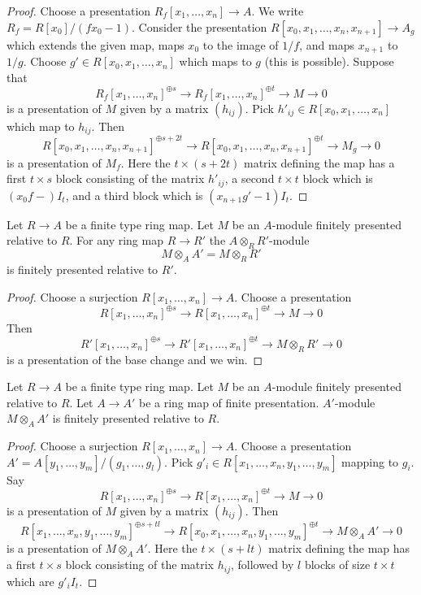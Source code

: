 \begin{proof}
Choose a presentation $R_f[x_1, \ldots, x_n] \to A$. We write
$R_f = R[x_0]/(fx_0 - 1)$. Consider the presentation
$R[x_0, x_1, \ldots, x_n, x_{n + 1}] \to A_g$ which extends the given
map, maps $x_0$ to the image of $1/f$, and maps $x_{n + 1}$ to $1/g$.
Choose $g' \in R[x_0, x_1, \ldots, x_n]$ which maps to $g$ (this is
possible). Suppose that
$$
R_f[x_1, \ldots, x_n]^{\oplus s} \to
R_f[x_1, \ldots, x_n]^{\oplus t} \to M \to 0
$$
is a presentation of $M$ given by a matrix $(h_{ij})$. Pick
$h'_{ij} \in R[x_0, x_1, \ldots, x_n]$ which map to $h_{ij}$.
Then
$$
R[x_0, x_1, \ldots, x_n, x_{n + 1}]^{\oplus s + 2t} \to
R[x_0, x_1, \ldots, x_n, x_{n + 1}]^{\oplus t} \to M_g \to 0
$$
is a presentation of $M_f$.
Here the $t \times (s + 2t)$ matrix defining the map has a first
$t \times s$ block consisting of the matrix $h'_{ij}$, a second
$t \times t$ block which is $(x_0f - )I_t$, and a third block
which is $(x_{n + 1}g' - 1)I_t$.
\end{proof}

\begin{lemma}
\label{lemma-base-change-relative-finite-presentation}
Let $R \to A$ be a finite type ring map. Let $M$ be an $A$-module finitely
presented relative to $R$. For any ring map $R \to R'$ the
$A \otimes_R R'$-module
$$
M \otimes_A A' = M \otimes_R R'
$$
is finitely presented relative to $R'$.
\end{lemma}

\begin{proof}
Choose a surjection $R[x_1, \ldots, x_n] \to A$. Choose a presentation
$$
R[x_1, \ldots, x_n]^{\oplus s} \to
R[x_1, \ldots, x_n]^{\oplus t} \to M \to 0
$$
Then
$$
R'[x_1, \ldots, x_n]^{\oplus s} \to
R'[x_1, \ldots, x_n]^{\oplus t} \to M \otimes_R R' \to 0
$$
is a presentation of the base change and we win.
\end{proof}

\begin{lemma}
\label{lemma-pull-relative-finite-presentation}
Let $R \to A$ be a finite type ring map.
Let $M$ be an $A$-module finitely presented relative to $R$.
Let $A \to A'$ be a ring map of finite presentation.
$A'$-module $M \otimes_A A'$ is finitely presented relative to $R$.
\end{lemma}

\begin{proof}
Choose a surjection $R[x_1, \ldots, x_n] \to A$. Choose a presentation
$A' = A[y_1, \ldots, y_m]/(g_1, \ldots, g_l)$.
Pick $g'_i \in R[x_1, \ldots, x_n, y_1, \ldots, y_m]$ mapping to $g_i$.
Say
$$
R[x_1, \ldots, x_n]^{\oplus s} \to
R[x_1, \ldots, x_n]^{\oplus t} \to M \to 0
$$
is a presentation of $M$ given by a matrix $(h_{ij})$.
Then
$$
R[x_1, \ldots, x_n, y_1, \ldots, y_m]^{\oplus s + tl} \to
R[x_0, x_1, \ldots, x_n, y_1, \ldots, y_m]^{\oplus t} \to M \otimes_A A' \to 0
$$
is a presentation of $M \otimes_A A'$.
Here the $t \times (s + lt)$ matrix defining the map has a first
$t \times s$ block consisting of the matrix $h_{ij}$, followed
by $l$ blocks of size $t \times t$ which are $g'_iI_t$.
\end{proof}

